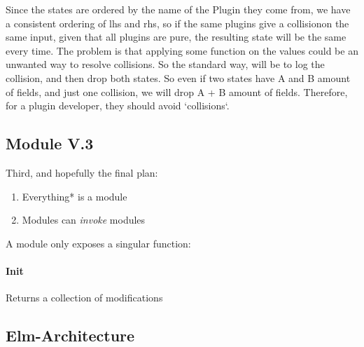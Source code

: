 Since the states are ordered by the name of the Plugin they come from, we
have a consistent ordering of lhs and rhs, so if the same plugins give a
collisionon the same input, given that all plugins are pure, the resulting
state will be the same every time.
The problem is that applying some function on the values could be an
unwanted way to resolve collisions. So the standard way, will be to log
the collision, and then drop both states. So even if two states have A and B
amount of fields, and just one collision, we will drop A + B amount of fields.
Therefore, for a plugin developer, they should avoid `collisions`.

\subsection{Module V.3}

Third, and hopefully the final plan:

\begin{enumerate}
  \item Everything* is a module
  \item Modules can \textit{invoke} modules
\end{enumerate}

A module only exposes a singular function:

\paragraph{Init} Returns a collection of modifications

\begin{center}
  
\end{center}

\begin{center}
  
\end{center}

\begin{center}
  
\end{center}

\begin{center}
  
\end{center}

\subsection{Elm-Architecture}

